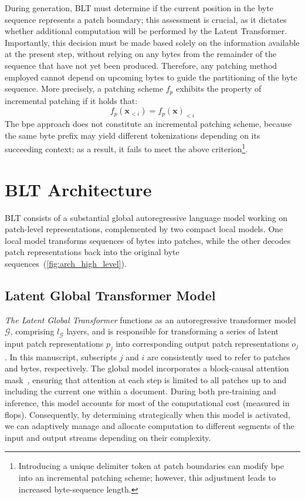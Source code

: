 During generation, {\textsc BLT} must determine if the current position in the byte sequence represents a patch boundary; this assessment is crucial, as it dictates whether additional computation will be performed by the Latent Transformer. Importantly, this decision must be made based solely on the information available at the present step, without relying on any bytes from the remainder of the sequence that have not yet been produced. Therefore, any patching method employed cannot depend on upcoming bytes to guide the partitioning of the byte sequence. More precisely, a patching scheme $f_p$ exhibits the property of incremental patching if it holds that:
$$f_p(\pmb{x}_{<i}) = f_p(\pmb{x})_{<i}$$
The bpe approach does not constitute an incremental patching scheme, because the same byte prefix may yield different tokenizations depending on its succeeding context; as a result, it fails to meet the above criterion\footnote{Introducing a unique delimiter token at patch boundaries can modify bpe into an incremental patching scheme; however, this adjustment leads to increased byte-sequence length.}.

\section{{\textsc BLT} Architecture}
\label{section:architecture}
{\textsc BLT} consists of a substantial global autoregressive language model working on patch-level representations, complemented by two compact local models. One local model transforms sequences of bytes into patches, while the other decodes patch representations back into the original byte sequences~(\autoref{fig:arch_high_level}).

\subsection{Latent Global Transformer Model}

\textit{The Latent Global Transformer} functions as an autoregressive transformer model $\mathcal{G}$, comprising $l_{\mathcal{G}}$ layers, and is responsible for transforming a series of latent input patch representations $p_j$ into corresponding output patch representations $o_j$. In this manuscript, subscripts $j$ and $i$ are consistently used to refer to patches and bytes, respectively. The global model incorporates a block-causal attention mask~\citep{dubey2024llama}, ensuring that attention at each step is limited to all patches up to and including the current one within a document. During both pre-training and inference, this model accounts for most of the computational cost (measured in flops). Consequently, by determining strategically when this model is activated, we can adaptively manage and allocate computation to different segments of the input and output streams depending on their complexity.


